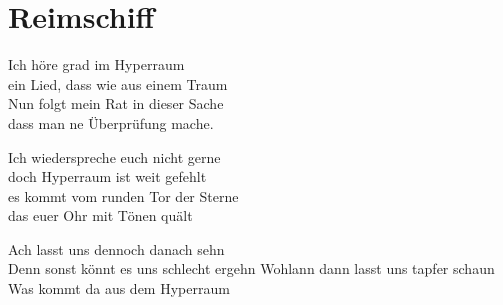 
\newpage
\section{Reimschiff}
\label{sec:reimschiff}
    \charaktere{\Frodo, \Legolars, \Monk, \Paul, \Spock, \Pille}

\begin{verseplay}[10em]
\s{\Spock} Ich höre grad im Hyperraum\\
ein Lied, dass wie aus einem Traum\\
Nun folgt mein Rat in dieser Sache\\
dass man ne Überprüfung mache.

\s{\Paul}  Ich wiederspreche euch nicht gerne\\
doch Hyperraum ist weit gefehlt\\
es kommt vom runden Tor der Sterne\\
das euer Ohr mit Tönen quält

\s{\Spock} Ach lasst uns dennoch danach sehn\\
Denn sonst könnt es uns schlecht ergehn
\s{\Paul} Wohlann dann lasst uns tapfer schaun\\
Was kommt da aus dem Hyperraum
\end{verseplay}



